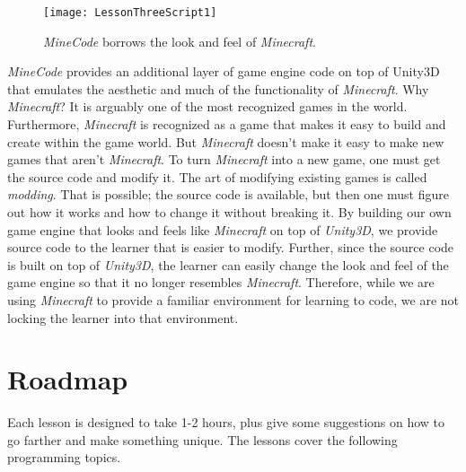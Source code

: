 \documentclass{article}
\begin{document}
\begin{figure}[t]
\centering
\texttt{[image: LessonThreeScript1]}
\caption{{\em MineCode} borrows the look and feel of {\em Minecraft}.}
\end{figure}

{\em MineCode} provides an additional layer of game engine code on top of Unity3D that emulates the aesthetic and much of the functionality of {\em Minecraft}.
Why {\em Minecraft}?
It is arguably one of the most recognized games in the world.
Furthermore, {\em Minecraft} is recognized as a game that makes it easy to build and create within the game world.
But {\em Minecraft} doesn't make it easy to make new games that aren't {\em Minecraft}.
To turn {\em Minecraft} into a new game, one must get the source code and modify it.
The art of modifying existing games is called {\em modding}.
That is possible; the source code is available, but then one must figure out how it works and how to change it without breaking it.
By building our own game engine that looks and feels like {\em Minecraft} on top of {\em Unity3D}, we provide source code to the learner that is easier to modify.
Further, since the source code is built on top of {\em Unity3D}, the learner can easily change the look and feel of the game engine so that it no longer resembles {\em Minecraft}. 
Therefore, while we are using {\em Minecraft} to provide a familiar environment for learning to code, we are not locking the learner into that environment.
 
 
\section{Roadmap}

Each lesson is designed to take 1-2 hours, plus give some suggestions on how to go farther and make something unique.
The lessons cover the following programming topics.
\end{document}

